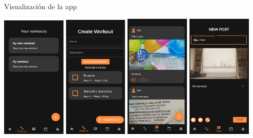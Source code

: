 \documentclass[12pt]{beamer}
\begin{document}
\begin{frame}{Visualización de la app}
{\begin{center}
\includegraphics[width=0.23\textwidth]{pres_1}
\includegraphics[width=0.23\textwidth]{pres_2}
\includegraphics[width=0.23\textwidth]{pres_3}
\includegraphics[width=0.23\textwidth]{pres_4}
\end{center}
}


\end{frame}
\end{document}
